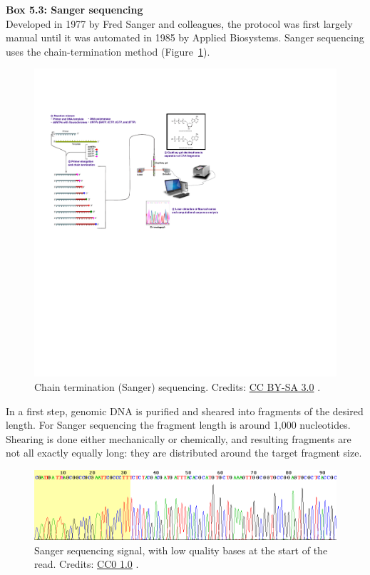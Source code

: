 \begin{framed}
\textbf{Box 5.3: Sanger sequencing}\\
Developed in 1977 by Fred Sanger and colleagues, the protocol was first
largely manual until it was automated in 1985 by Applied Biosystems. Sanger
sequencing uses the chain-termination method (Figure~\ref{sanger}).

\begin{figure}[!htbp]
\centering
\includegraphics[width=0.7\linewidth]{files/sanger-8b9e6bd1f6eb7c5c40373699fe4a893d.pdf}
\caption[]{Chain termination (Sanger) sequencing.
Credits: \href{https://creativecommons.org/licenses/by-sa/3.0/}{CC BY-SA 3.0} \cite{sanger_2012}.}
\label{sanger}
\end{figure}

In a first step, genomic DNA is purified and sheared into fragments of the desired length. For Sanger
sequencing the fragment length is around 1,000 nucleotides. Shearing is
done either mechanically or chemically, and resulting fragments are not all
exactly equally long: they are distributed around the target fragment size.

\begin{figure}[!htbp]
\centering
\includegraphics[width=0.7\linewidth]{files/sanger-signal-d3e41d780e1b2a30990d840a13be80b4.png}
\caption[]{Sanger sequencing signal, with low quality bases at the start of the read.
Credits: \href{https://creativecommons.org/publicdomain/zero/1.0/}{CC0 1.0} \cite{sanger_signal_2005}.}
\label{sanger_signal}
\end{figure}


\end{framed}
